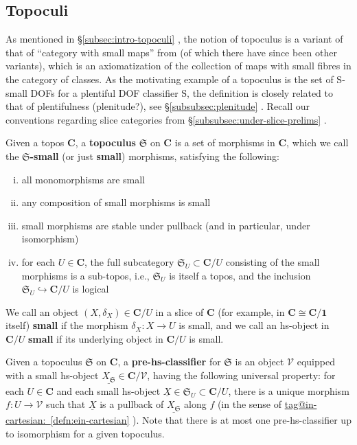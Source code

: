 \documentclass{amsart}
\makeatletter
\newcommand\bC{\mathbf{C}}
\newcommand\cV{\mathcal{V}}
\newcommand\defword[1]{{\boldmath \textbf{#1}}}
\newcommand\fS{\mathfrak{S}}
\newcommand\hto{\hookrightarrow}
\newcommand\rS{\mathrm{S}}
\newcommand\tm{\mathbf{1}}
\newcommand\und[1]{\underline{#1}}
\newcommand\tagword[1]{\csname tag@#1\endcsname}
\def\label@tag#1:#2\@nil{#1}
\newcommand\labeltag[1]{\label@tag#1:\@nil}
\newcommand\jref[1]{%
  \texorpdfstring%
    {\hyperref[#1]{\tagword{\labeltag{#1}}~\ref*{#1}}}%
    {\tagword{\labeltag{#1}}~\ref*{#1}}%
}
\newcommand\prerefpost[3]{%
  \texorpdfstring%
    {\hyperref[#2]{#1\ref*{#2}#3}}%
    {#1\ref*{#2}#3}%
}
\newcommand\sref[1]{\prerefpost{\S}{#1}{}}
\theoremstyle{definition}
\theoremstyle{remark}
\theoremstyle{plainwithref}
\makeatother
\begin{document}
\subsection{Topoculi} \label{subsec:topoculi}
As mentioned in \sref{subsec:intro-topoculi}, the notion of topoculus is a variant of that of ``category with small maps'' from \cite{joyal-moerdijk-ast} (of which there have since been other variants), which is an axiomatization of the collection of maps with small fibres in the category of classes.
As the motivating example of a topoculus is the set of \( \rS \)-small DOFs for a plentiful DOF classifier \( \rS \), the definition is closely related to that of plentifulness (plenitude?), see \sref{subsubsec:plenitude}.
Recall our conventions regarding slice categories from \sref{subsubsec:under-slice-prelims}.
\begin{defn} \label{defn:topoculus}
  Given a topos \( \bC \), a \defword{topoculus} \( \fS \) on \( \bC \) is a set of morphisms in \( \bC \), which we call the \defword{\( \fS \)-small} (or just \defword{small}) morphisms, satisfying the following:
  \begin{enumerate}[(i)]
  \item \label{item:topoculus-monos} all monomorphisms are small
  \item \label{item:topoculus-comp} any composition of small morphisms is small
  \item \label{item:topoculus-pb} small morphisms are stable under pullback (and in particular, under isomorphism)
  \item for each \( U \in \bC \), the full subcategory \( \fS_U \subset \bC / U \) consisting of the small morphisms is a sub-topos, i.e., \( \fS_U \) is itself a topos, and the inclusion \( \fS_U \hto \bC / U \) is logical
  \end{enumerate}
  We call an object \( (X, \delta_X) \in \bC / U \) in a slice of \( \bC \) (for example, in \( \bC \cong \bC / \tm \) itself) \defword{small} if the morphism \( \delta_X \colon X \to U \) is small, and we call an hs-object in \( \bC / U \) \defword{small} if its underlying object in \( \bC / U \) is small.

  Given a topoculus \( \fS \) on \( \bC \), a \defword{pre-hs-classifier} for \( \fS \) is an object \( \cV \) equipped with a small hs-object \( \und{X_\fS} \in \bC / \cV \), having the following universal property: for each \( U \in \bC \) and each small hs-object \( \und X \in \fS_U \subset \bC / U \), there is a unique morphism \( f \colon U \to \cV \) such that \( \und X \) is a pullback of \( \und{X_\fS} \) along \( f \) (in the sense of \jref{defn:ein-cartesian}).
  Note that there is at most one pre-hs-classifier up to isomorphism for a given topoculus.


\end{defn}
\end{document}

